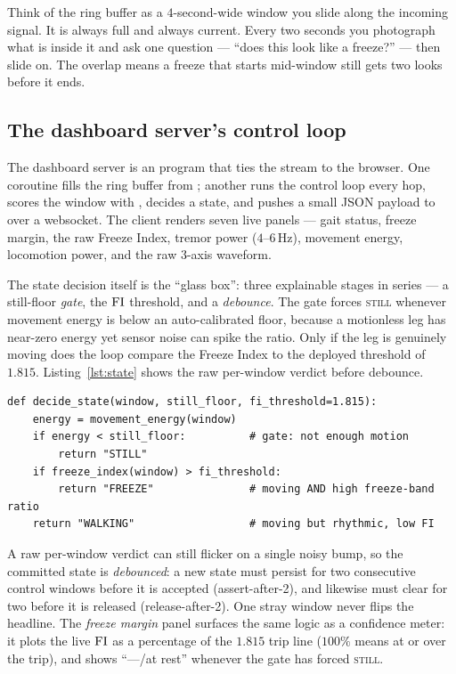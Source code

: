 \begin{intuition}
Think of the ring buffer as a $4$-second-wide window you slide along the incoming
signal. It is always full and always current. Every two seconds you photograph what is
inside it and ask one question --- ``does this look like a freeze?'' --- then slide on.
The overlap means a freeze that starts mid-window still gets two looks before it ends.
\end{intuition}

\subsection{The dashboard server's control loop}

The dashboard server is an  program that ties the stream to the browser.
One coroutine fills the ring buffer from ; another runs the control loop
every hop, scores the window with , decides a state, and pushes a small
JSON payload to  over a websocket. The client renders seven live
panels --- gait status, freeze margin, the raw Freeze Index, tremor power
($4$--$6$\,Hz), movement energy, locomotion power, and the raw $3$-axis waveform.

The state decision itself is the ``glass box'': three explainable stages in series ---
a still-floor \emph{gate}, the $\mathrm{FI}$ threshold, and a \emph{debounce}. The gate forces
\textsc{still} whenever movement energy is below an auto-calibrated floor, because a
motionless leg has near-zero energy yet sensor noise can spike the ratio. Only if the
leg is genuinely moving does the loop compare the Freeze Index to the deployed
threshold of $1.815$. Listing~\ref{lst:state} shows the raw per-window verdict before
debounce.

\begin{lstlisting}[style=py,caption={The gated state decision (one window, pre-debounce).
The gate runs first so a still leg can never be called a freeze.},label={lst:state}]
def decide_state(window, still_floor, fi_threshold=1.815):
    energy = movement_energy(window)
    if energy < still_floor:          # gate: not enough motion
        return "STILL"
    if freeze_index(window) > fi_threshold:
        return "FREEZE"               # moving AND high freeze-band ratio
    return "WALKING"                  # moving but rhythmic, low FI
\end{lstlisting}

A raw per-window verdict can still flicker on a single noisy bump, so the committed
state is \emph{debounced}: a new state must persist for two consecutive control windows
before it is accepted (assert-after-2), and likewise must clear for two before it is
released (release-after-2). One stray window never flips the headline. The
\emph{freeze margin} panel surfaces the same logic as a confidence meter: it plots the
live $\mathrm{FI}$ as a percentage of the $1.815$ trip line ($100\%$ means at or over the
trip), and shows ``---/at rest'' whenever the gate has forced \textsc{still}.

